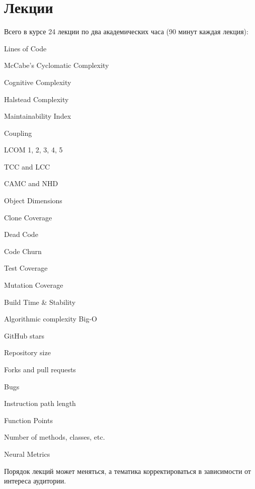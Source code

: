 \documentclass[nobrand,anonymous,nodate,nosecurity]{huawei}
\begin{document}
\section{Лекции}

Всего в курсе 24 лекции по два академических часа (90 минут каждая лекция):
\begin{enumerate}
    \setlength\itemsep{0em}
    \item Lines of Code
    \item McCabe's Cyclomatic Complexity
    \item Cognitive Complexity
    \item Halstead Complexity
    \item Maintainability Index

    \item Coupling
    \item LCOM 1, 2, 3, 4, 5
    \item TCC and LCC
    \item CAMC and NHD
    \item Object Dimensions

    \item Clone Coverage
    \item Dead Code
    \item Code Churn

{\color{gray}
    \item Test Coverage
    \item Mutation Coverage
    \item Build Time \& Stability

    \item Algorithmic complexity Big-O

    \item GitHub stars
    \item Repository size
    \item Forks and pull requests
    \item Bugs

    \item Instruction path length
    \item Function Points
    \item Number of methods, classes, etc.

    \item Neural Metrics}
\end{enumerate}

Порядок лекций может меняться, а тематика корректироваться в зависимости от интереса аудитории.
\end{document}

